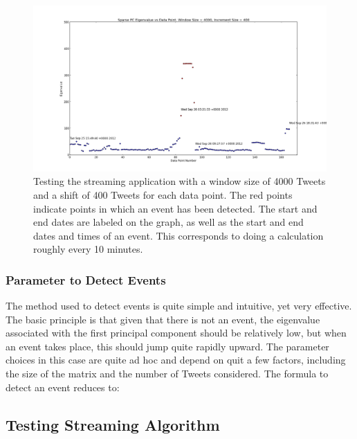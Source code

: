 \documentclass[11pt,a4paper]{article}
\begin{document}
\begin{figure}[H]
\centering
\includegraphics[scale=0.25]{Testing_Streaming_App_4000_400.png}
\caption{Testing the streaming application with a window size of 4000 Tweets and a shift of 400 Tweets for each data point. The red points indicate points in which an event has been detected. The start and end dates are labeled on the graph, as well as the start and end dates and times of an event. This corresponds to doing a calculation roughly every  10 minutes.}
\label{testing_app_4000}
\end{figure}

\subsubsection{Parameter to Detect Events}
The method used to detect events is quite simple and intuitive, yet very effective. The basic principle is that given that there is not an event, the eigenvalue associated with the first principal component should be relatively low, but when an event takes place, this should jump quite rapidly upward. The parameter choices in this case are quite ad hoc and depend on quit a few factors, including the size of the matrix and the number of Tweets considered. The formula to detect an event reduces to:


\subsection{Testing Streaming Algorithm} 

\end{document}
